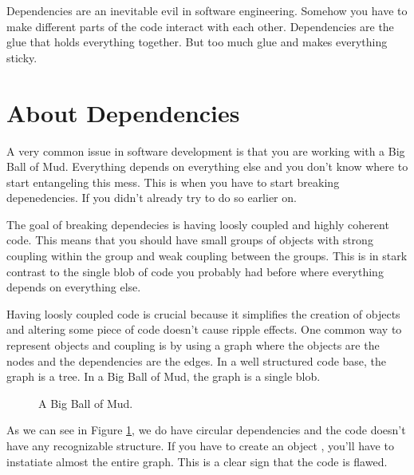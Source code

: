 Dependencies are an inevitable evil in software engineering. Somehow you have to make different parts of the code interact with each other. Dependencies are the glue that holds everything together. But too much glue and makes everything sticky.

\section{About Dependencies}

A very common issue in software development is that you are working with a Big Ball of Mud. Everything depends on everything else and you don't know where to start entangeling this mess. This is when you have to start breaking depenedencies. If you didn't already try to do so earlier on.

The goal of breaking dependecies is having loosly coupled and highly coherent code. This means that you should have small groups of objects with strong coupling within the group and weak coupling between the groups. This is in stark contrast to the single blob of code you probably had before where everything depends on everything else.

Having loosly coupled code is crucial because it simplifies the creation of objects and altering some piece of code doesn't cause ripple effects. One common way to represent objects and coupling is by using a graph where the objects are the nodes and the dependencies are the edges. In a well structured code base, the graph is a tree. In a Big Ball of Mud, the graph is a single blob.


\begin{figure}[h]
    \centering
    \caption{A Big Ball of Mud.}
    \label{fig:big_ball_of_mud}
\end{figure}

As we can see in Figure \ref{fig:big_ball_of_mud}, we do have circular dependencies and the code doesn't have any recognizable structure. If you have to create an object , you'll have to instatiate almost the entire graph. This is a clear sign that the code is flawed.

